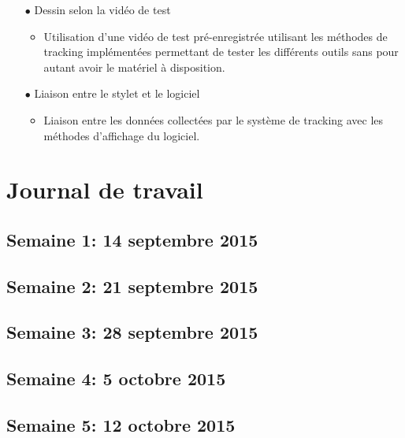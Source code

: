 \documentclass[11pt,a4paper,oldfontcommands]{memoir}
\begin{document}
\begin{itemize}
\begin{itemize}
	\end{itemize}
\item[$\bullet$] Dessin selon la vidéo de test
    \begin{itemize}
	\item Utilisation d’une vidéo de test pré-enregistrée utilisant les méthodes de tracking implémentées permettant de tester les différents outils sans pour autant avoir le matériel à disposition.
	\end{itemize}
\item[$\bullet$] Liaison entre le stylet et le logiciel
    \begin{itemize}
	\item Liaison entre les données collectées par le système de tracking avec les méthodes d’affichage du logiciel.
	\end{itemize}
\end{itemize}


\chapter{Journal de travail}

\section{Semaine 1: 14 septembre 2015}

\section{Semaine 2: 21 septembre 2015}

\section{Semaine 3: 28 septembre 2015}

\section{Semaine 4: 5 octobre 2015}

\section{Semaine 5: 12 octobre 2015}
\end{document}

